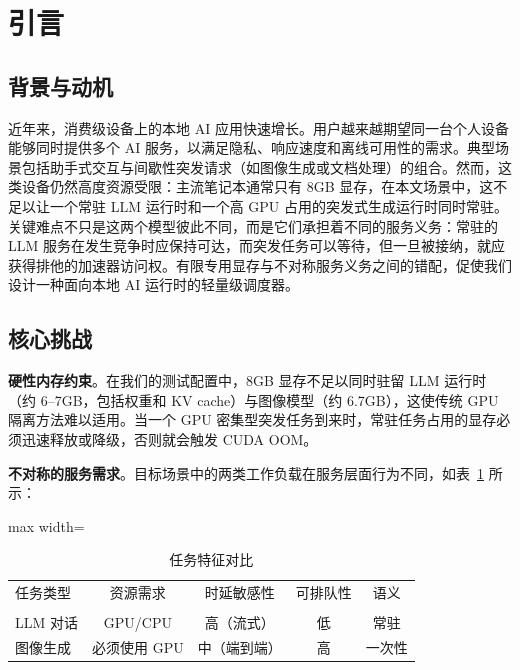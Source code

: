 \section{引言}

\subsection{背景与动机}

近年来，消费级设备上的本地 AI 应用快速增长。用户越来越期望同一台个人设备能够同时提供多个 AI 服务，以满足隐私、响应速度和离线可用性的需求。典型场景包括助手式交互与间歇性突发请求（如图像生成或文档处理）的组合。然而，这类设备仍然高度资源受限：主流笔记本通常只有 8GB 显存，在本文场景中，这不足以让一个常驻 LLM 运行时和一个高 GPU 占用的突发式生成运行时同时常驻。关键难点不只是这两个模型彼此不同，而是它们承担着不同的服务义务：常驻的 LLM 服务在发生竞争时应保持可达，而突发任务可以等待，但一旦被接纳，就应获得排他的加速器访问权。有限专用显存与不对称服务义务之间的错配，促使我们设计一种面向本地 AI 运行时的轻量级调度器。

\subsection{核心挑战}

\textbf{硬性内存约束}。在我们的测试配置中，8GB 显存不足以同时驻留 LLM 运行时（约 6--7GB，包括权重和 KV cache）与图像模型（约 6.7GB），这使传统 GPU 隔离方法难以适用。当一个 GPU 密集型突发任务到来时，常驻任务占用的显存必须迅速释放或降级，否则就会触发 CUDA OOM。

\textbf{不对称的服务需求}。目标场景中的两类工作负载在服务层面行为不同，如表~\ref{tab:task_characteristics} 所示：

\begin{table}[htbp]
\caption{任务特征对比}
\label{tab:task_characteristics}
\centering
\small
\begin{adjustbox}{max width=\columnwidth}
\begin{tabular}{@{}lcccc@{}}
\toprule
任务类型 & 资源需求 & 时延敏感性 & 可排队性 & 语义 \\
 &  &  &  &  \\
\midrule
LLM 对话 & GPU/CPU & 高（流式） & 低 & 常驻 \\
图像生成 & 必须使用 GPU & 中（端到端） & 高 & 一次性 \\
\bottomrule
\end{tabular}
\end{adjustbox}
\end{table}

